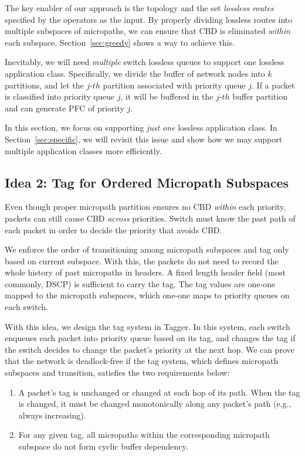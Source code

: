 The key enabler of our approach is the topology and the set {\em lossless routes} specified by the operators
as the input. By properly dividing lossless routes into multiple subspaces of micropaths, we can
ensure that CBD is eliminated {\em within} each subspace. Section~\ref{sec:greedy} shows a way to achieve this.

Inevitably, we will need {\em multiple} switch lossless queues to support one lossless application class.
Specifically, we divide the buffer of network nodes into $k$ partitions, and let the $j$-$th$ partition associated 
with priority queue $j$. If a packet is classified into priority queue $j$, it will be buffered in the $j$-$th$ buffer 
partition and can generate PFC of priority $j$. 

In this section, we focus on supporting {\em just one} lossless application class. In Section~\ref{sec:specific}, we will revisit 
this issue and show how we may support multiple application classes more efficiently.

\subsection{Idea 2: Tag for Ordered Micropath Subspaces}\label{sec:tag_order}

Even though proper micropath partition ensures no CBD {\em within} each priority, packets can still cause CBD
{\em across} priorities. Switch must know the past path of each packet in order to decide the priority that avoids CBD.

We enforce the order of transitioning among micropath subspaces and tag only based on current subspace.
With this, the packets do not need to record the whole history of past micropaths in headers. A fixed length 
header field (most commonly, DSCP) is sufficient to carry the tag. The tag values are one-one mapped to the micropath subspaces,
which one-one maps to priority queues on each switch. 

With this idea, we design the tag system in Tagger. In this system, each switch enqueues each packet into priority queue based
on its tag, and changes the tag if the switch decides to change the packet's priority at the next hop.
We can prove that the network is deadlock-free if the tag system, which defines micropath subspaces and transition, 
satisfies the two requirements below:

\begin{enumerate}

	\item A packet's tag is unchanged or changed at each hop of its path. When the tag is changed, it must be changed monotonically 
	along any packet's path (e.g., always increasing).

	\item For any given tag, all micropaths within the corresponding micropath subspace do not form cyclic buffer dependency.

\end{enumerate}

